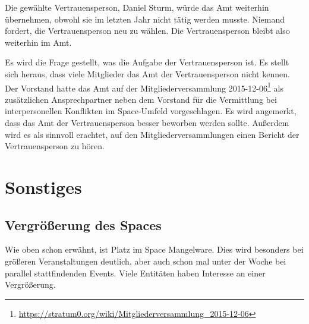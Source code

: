 \documentclass{s0minutes}
\begin{document}
Die gewählte Vertrauensperson, Daniel Sturm, würde das Amt weiterhin
übernehmen, obwohl sie im letzten Jahr nicht tätig werden musste. Niemand
fordert, die Vertrauensperson neu zu wählen. Die Vertrauensperson bleibt also
weiterhin im Amt.

Es wird die Frage gestellt, was die Aufgabe der Vertrauensperson ist. Es stellt
sich heraus, dass viele Mitglieder das Amt der Vertrauensperson nicht kennen.
Der Vorstand hatte das Amt auf der Mitgliederversammlung
2015-12-06\footnote{\url{https://stratum0.org/wiki/Mitgliederversammlung_2015-12-06}}
als zusätzlichen Ansprechpartner neben dem Vorstand für die Vermittlung bei
interpersonellen Konflikten im Space-Umfeld vorgeschlagen. Es wird angemerkt,
dass das Amt der Vertrauensperson besser beworben werden sollte. Außerdem wird
es als sinnvoll erachtet, auf den Mitgliederversammlungen einen Bericht der
Vertrauensperson zu hören.

\section{Sonstiges}

\subsection{Vergrößerung des Spaces}

Wie oben schon erwähnt, ist Platz im Space Mangelware. Dies wird besonders bei
größeren Veranstaltungen deutlich, aber auch schon mal unter der Woche bei
parallel stattfindenden Events. Viele Entitäten haben Interesse an einer
Vergrößerung.
\end{document}
